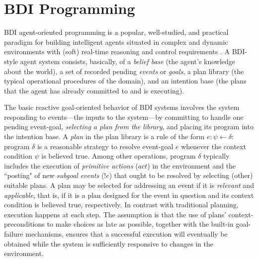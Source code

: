 \section{BDI Programming}\label{sec:preliminaries}

BDI agent-oriented programming is a popular, well-studied, and practical paradigm
for building intelligent agents situated in complex and dynamic environments with
(soft) real-time reasoning and control requirements
\cite{Benfield:AAMAS06,Georgeff89-PRS}.
A BDI-style agent system consists, basically, of a \emph{belief base} (the
agent's knowledge about the world), a set of recorded pending \emph{events} or
\emph{goals}, a plan library (the typical operational procedures of the domain),
and an intention base (the plans that the agent has already committed to and is
executing).



The basic reactive goal-oriented behavior of BDI systems involves the system
responding to events---the inputs to the system---by committing to handle one
pending event-goal, \textit{selecting a plan from the library}, and placing its
program into the intention base.
A \emph{plan} in the plan library is a rule of the form $e: \psi \leftarrow
\delta$: program $\delta$ is a reasonable strategy to resolve event-goal $e$
whenever the context condition $\psi$ is believed true.
Among other operations, program $\delta$ typically includes the execution of
\emph{primitive actions} ($act$) in the environment and the ``posting" of new
\emph{subgoal events} ($!e$) that ought to be resolved by selecting (other)
suitable plans.
A plan may be selected for addressing an event if it is \textit{relevant} and
\textit{applicable}, that is, if it is a plan designed for the event in question
and its context condition is believed true, respectively.
In contrast with traditional planning, execution happens at each step. The
assumption is that the use of plans' context-preconditions to make choices as
late as possible, together with the built-in goal-failure mechanisms, ensures
that a successful execution will eventually be obtained while the system is
sufficiently responsive to changes in the environment.




